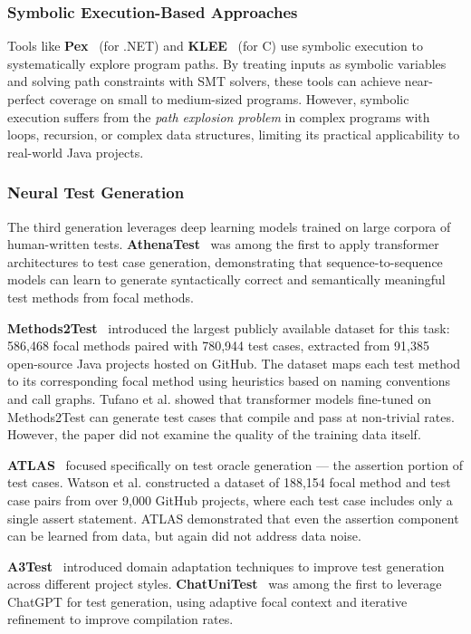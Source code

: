 \documentclass[acmlarge,nonacm,screen]{acmart}
\begin{document}
\subsubsection{Symbolic Execution-Based Approaches}

Tools like \textbf{Pex}~\cite{tillmann2008pex} (for .NET) and \textbf{KLEE}~\cite{cadar2008klee} (for C) use symbolic execution to systematically explore program paths. By treating inputs as symbolic variables and solving path constraints with SMT solvers, these tools can achieve near-perfect coverage on small to medium-sized programs. However, symbolic execution suffers from the \textit{path explosion problem} in complex programs with loops, recursion, or complex data structures, limiting its practical applicability to real-world Java projects.

\subsubsection{Neural Test Generation}

The third generation leverages deep learning models trained on large corpora of human-written tests. \textbf{AthenaTest}~\cite{tufano2022athenatest} was among the first to apply transformer architectures to test case generation, demonstrating that sequence-to-sequence models can learn to generate syntactically correct and semantically meaningful test methods from focal methods.

\textbf{Methods2Test}~\cite{tufano2022methods2test} introduced the largest publicly available dataset for this task: 586,468 focal methods paired with 780,944 test cases, extracted from 91,385 open-source Java projects hosted on GitHub. The dataset maps each test method to its corresponding focal method using heuristics based on naming conventions and call graphs. Tufano et al. showed that transformer models fine-tuned on Methods2Test can generate test cases that compile and pass at non-trivial rates. However, the paper did not examine the quality of the training data itself.

\textbf{ATLAS}~\cite{watson2020atlas} focused specifically on test oracle generation --- the assertion portion of test cases. Watson et al. constructed a dataset of 188,154 focal method and test case pairs from over 9,000 GitHub projects, where each test case includes only a single assert statement. ATLAS demonstrated that even the assertion component can be learned from data, but again did not address data noise.

\textbf{A3Test}~\cite{alagarsamy2023a3test} introduced domain adaptation techniques to improve test generation across different project styles. \textbf{ChatUniTest}~\cite{chen2024chatunitest} was among the first to leverage ChatGPT for test generation, using adaptive focal context and iterative refinement to improve compilation rates.
\end{document}
